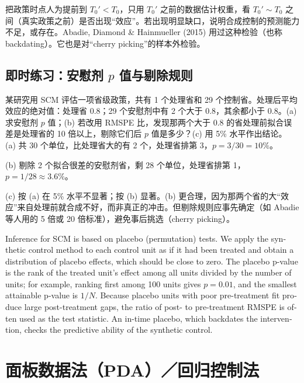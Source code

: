 把政策时点人为提前到 $T_0'<T_0$，只用 $T_0'$ 之前的数据估计权重，看 $T_0'\sim T_0$ 之间（真实政策之前）是否出现“效应”。若出现明显缺口，说明合成控制的预测能力不足，或存在。Abadie, Diamond \& Hainmueller (2015) 用过这种检验（也称 backdating）。它也是对“cherry picking”的样本外检验。

\subsection{即时练习：安慰剂 \texorpdfstring{$p$}{p} 值与剔除规则}

\begin{prac}[安慰剂检验]
某研究用 SCM 评估一项省级政策，共有 1 个处理省和 29 个控制省。处理后平均效应的绝对值：处理省 0.8；29 个安慰剂中有 2 个大于 0.8，其余都小于 0.8。(a) 求安慰剂 $p$ 值；(b) 若改用 RMSPE 比，发现那两个大于 0.8 的省处理前拟合误差是处理省的 10 倍以上，剔除它们后 $p$ 值是多少？(c) 用 5\% 水平作出结论。
\answer
(a) 共 30 个单位，比处理省大的有 2 个，处理省排第 3，$p=3/30=10\%$。

(b) 剔除 2 个拟合很差的安慰剂省，剩 28 个单位，处理省排第 1，$p=1/28\approx3.6\%$。

(c) 按 (a) 在 5\% 水平不显著；按 (b) 显著。(b) 更合理，因为那两个省的大“效应”来自处理前就合成不好，而非真正的冲击。但剔除规则应事先确定（如 Abadie 等人用的 5 倍或 20 倍标准），避免事后挑选（cherry picking）。
\end{prac}

\begin{english}
Inference for SCM is based on placebo (permutation) tests. We apply the synthetic control method to each control unit as if it had been treated and obtain a distribution of placebo effects, which should be close to zero. The placebo p-value is the rank of the treated unit's effect among all units divided by the number of units; for example, ranking first among 100 units gives $p=0.01$, and the smallest attainable p-value is $1/N$. Because placebo units with poor pre-treatment fit produce large post-treatment gaps, the ratio of post- to pre-treatment RMSPE is often used as the test statistic. An in-time placebo, which backdates the intervention, checks the predictive ability of the synthetic control.
\end{english}

\section{面板数据法（PDA）／回归控制法}\label{sec:U16-pda}

